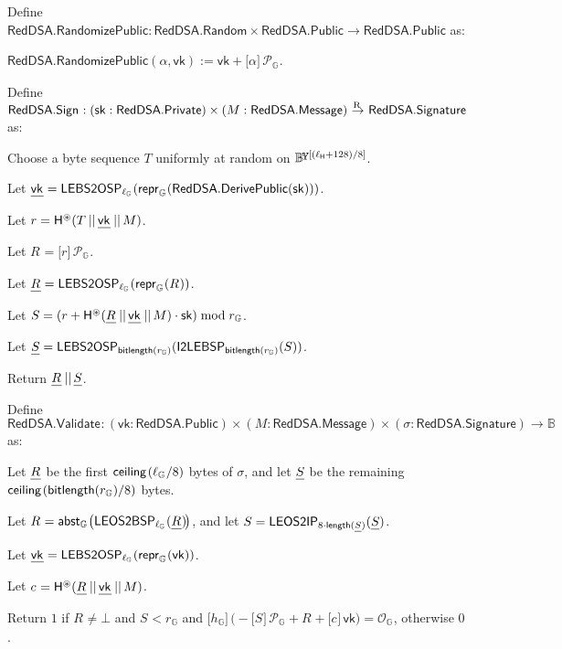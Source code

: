 \documentclass{article}
\newcommand{\typecolon}{:}
\newcommand{\bytes}[1]{\underline{\raisebox{-0.3ex}{}\smash{#1}}}
\newcommand{\bit}{\mathbb{B}}
\newcommand{\overlap}[2]{\rlap{#2}\hspace{#1}{#2}}
\newcommand{\byte}{\mathbb{B}\kern -0.1em\raisebox{0.48ex}{\overlap{0.0001em}{\scalebox{0.7}{$\mathbb{Y}$}}}}
\newcommand{\typeexp}[2]{{#1}\vphantom{)}^{[{#2}]}}
\newcommand{\byteseq}[1]{\typeexp{\byte}{#1}}
\newcommand{\bconcat}{\mathop{\kern 0.05em||}}
\newcommand{\length}{\mathsf{length}}
\newcommand{\bitlength}{\mathsf{bitlength}}
\newcommand{\ceiling}[1]{\mathsf{ceiling}\kern-0.06em\left({#1}\right)}
\newcommand{\mult}{\cdot}
\newcommand{\scalarmult}[2]{\boldsymbol{[}{#1}\boldsymbol{]}\,{#2}}
\newcommand{\clasp}[3][0pt]{\stackengine{0pt}{#3}{\kern#1#2}{O}{c}{F}{F}{L}}
\newcommand{\rightarrowR}{\mathop{\clasp[-0.18em]{\raisebox{1.15ex}{\scriptsize R}}{$\,\rightarrow\,$}}}
\newcommand{\sk}{\mathsf{sk}}
\newcommand{\vk}{\mathsf{vk}}
\newcommand{\vkBytes}[1]{\bytes{\vk_{#1}}}
\newcommand{\RedDSA}{\mathsf{RedDSA}}
\newcommand{\RedDSAPublic}{\RedDSA\mathsf{.Public}}
\newcommand{\RedDSAPrivate}{\RedDSA\mathsf{.Private}}
\newcommand{\RedDSAMessage}{\RedDSA\mathsf{.Message}}
\newcommand{\RedDSASignature}{\RedDSA\mathsf{.Signature}}
\newcommand{\RedDSADerivePublic}{\RedDSA\mathsf{.DerivePublic}}
\newcommand{\RedDSASign}[1]{\RedDSA\mathsf{.Sign}_{#1}}
\newcommand{\RedDSAValidate}[1]{\RedDSA\mathsf{.Validate}_{#1}}
\newcommand{\RedDSARandom}{\RedDSA\mathsf{.Random}}
\newcommand{\RedDSARandomizePublic}{\RedDSA\mathsf{.RandomizePublic}}
\newcommand{\RedDSARandomizer}{\alpha}
\newcommand{\RedDSASigR}[1]{R_{#1}}
\newcommand{\RedDSASigS}[1]{S_{#1}}
\newcommand{\RedDSAReprR}[1]{\bytes{\RedDSASigR{#1}}}
\newcommand{\RedDSAReprS}[1]{\bytes{\RedDSASigS{#1}}}
\newcommand{\RedDSASigc}[1]{c_{#1}}
\newcommand{\RedDSAHash}{\mathsf{H}}
\newcommand{\RedDSAHashToScalar}{\RedDSAHash^{\circledast}}
\newcommand{\RedDSAHashLength}{\ell_{\RedDSAHash}}
\newcommand{\Zero}{\mathcal{O}}
\newcommand{\Generator}{\mathcal{P}}
\newcommand{\ParamG}[1]{{{#1}_\mathbb{G}}}
\newcommand{\GroupG}[1]{\mathbb{G}_{#1}}
\newcommand{\ZeroG}[1]{\Zero_{\GroupG{#1}}}
\newcommand{\GenG}[1]{\Generator_{\GroupG{#1}}}
\newcommand{\ellG}[1]{\ell_{\GroupG{#1}}}
\newcommand{\reprG}[1]{\repr_{\GroupG{#1}}}
\newcommand{\abstG}[1]{\abst_{\GroupG{#1}}}
\newcommand{\repr}{\mathsf{repr}}
\newcommand{\abst}{\mathsf{abst}}
\newcommand{\ItoLEBSP}[1]{\mathsf{I2LEBSP}_{#1}}
\newcommand{\LEOStoIP}[1]{\mathsf{LEOS2IP}_{#1}}
\newcommand{\LEBStoOSP}[1]{\mathsf{LEBS2OSP}_{#1}}
\newcommand{\LEOStoBSP}[1]{\mathsf{LEOS2BSP}_{#1}}
\begin{document}
Define $\RedDSARandomizePublic \typecolon \RedDSARandom \times \RedDSAPublic \rightarrow \RedDSAPublic$ as:
\begin{formulae}
  \item $\RedDSARandomizePublic(\RedDSARandomizer, \vk) := \vk + \scalarmult{\RedDSARandomizer}{\GenG{}}$.
\end{formulae}

Define $\RedDSASign{} \typecolon (\sk \typecolon \RedDSAPrivate) \times (M \typecolon \RedDSAMessage) \rightarrowR \RedDSASignature$ as:
\begin{algorithm}
  \item Choose a byte sequence $T$ uniformly at random on $\byteseq{(\RedDSAHashLength+128)/8}$.
  \item Let $\vkBytes{} = \LEBStoOSP{\ellG{}}(\reprG{}(\RedDSADerivePublic(\sk)))$.
  \item Let $r = \RedDSAHashToScalar(T \bconcat \vkBytes{} \bconcat M)$.
  \item Let $\RedDSASigR{} = \scalarmult{r}{\GenG{}}$.
  \item Let $\RedDSAReprR{} = \LEBStoOSP{\ellG{}}(\reprG{}(\RedDSASigR{}))$.
  \item Let $\RedDSASigS{} = (r + \RedDSAHashToScalar(\RedDSAReprR{} \bconcat \vkBytes{} \bconcat M) \mult \sk) \bmod \ParamG{r}$.
  \item Let $\RedDSAReprS{} = \LEBStoOSP{\bitlength(\ParamG{r})}(\ItoLEBSP{\bitlength(\ParamG{r})}(\RedDSASigS{}))$.
  \item Return $\RedDSAReprR{} \bconcat \RedDSAReprS{}$.
\end{algorithm}

Define $\RedDSAValidate{} \typecolon (\vk \typecolon \RedDSAPublic) \times (M \typecolon \RedDSAMessage) \times
        (\sigma \typecolon \RedDSASignature) \rightarrow \bit$ as:
\begin{algorithm}
  \item Let $\RedDSAReprR{}$ be the first $\ceiling{\ellG{}/8}$ bytes of $\sigma$, and
        let $\RedDSAReprS{}$ be the remaining $\ceiling{\bitlength(\ParamG{r})/8}$ bytes.
  \item Let $\RedDSASigR{} = \abstG{}\big(\LEOStoBSP{\ellG{}}(\RedDSAReprR{})\kern-0.15em\big)$, and
        let $\RedDSASigS{} = \LEOStoIP{8 \mult \length(\RedDSAReprS{})}(\RedDSAReprS{})$.
  \item Let $\vkBytes{} = \LEBStoOSP{\ellG{}}(\reprG{}(\vk))$.
  \item Let $\RedDSASigc{} = \RedDSAHashToScalar(\RedDSAReprR{} \bconcat \vkBytes{} \bconcat M)$.
  \item Return $1$ if $\RedDSASigR{} \neq \bot$ and $\RedDSASigS{} < \ParamG{r}$ and
        $\scalarmult{\ParamG{h}}{\big(\!\!-\!\scalarmult{\RedDSASigS{}}{\GenG{}} + \RedDSASigR{} + \scalarmult{\RedDSASigc{}}{\vk}\big)} = \ZeroG{}$, otherwise $0$.
\end{algorithm}
\end{document}
